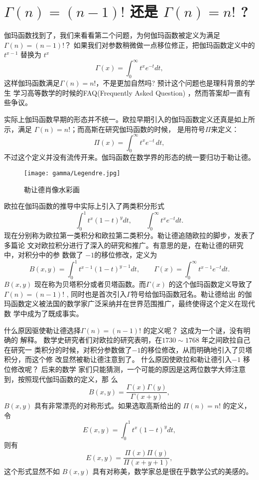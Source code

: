 {\section{$ \Gamma(n) = (n-1)!$ 还是  $ \Gamma(n) = n! $ ? }

伽玛函数找到了，我们来看看第二个问题，为何伽玛函数被定义为满足
$\Gamma(n)=(n-1)!$？ 如果我们对参数稍微做一点移位修正，把伽玛函数定义中的 $t^{x-1}$
替换为 $t^x$ 
$$ \Gamma(x) = \int_0^{\infty} t^{x}e^{-t}dt , $$
这样伽玛函数满足$\Gamma(n)=n!$，不是更加自然吗? 预计这个问题也是理科背景的学生
学习高等数学的时候的FAQ(Frequently Asked Question) ，然而答案却一直有些争议。  

实际上伽玛函数早期的形态并不统一。欧拉早期引入的伽玛函数定义还真是如上所示，满足
$\Gamma(n)=n!$；而高斯在研究伽玛函数的时候， 是用符号$\Pi$来定义： 
$$ \Pi(x)=\int_{0}^\infty t^x e^{-t}\,dt ,$$ 
不过这个定义并没有流传开来。伽玛函数在数学界的形态的统一要归功于勒让德。

\begin{figure}[htbp]
\centering
\texttt{[image: gamma/Legendre.jpg]}
\caption{勒让德肖像水彩画}
\end{figure}

欧拉在伽玛函数的推导中实际上引入了两类积分形式
$$ \int_0^1 t^{x}(1-t)^{y}dt, \quad  \quad \int_0^{\infty} t^{x}e^{-t}dt .$$
现在分别称为欧拉第一类积分和欧拉第二类积分。勒让德追随欧拉的脚步，发表了多篇论
文对欧拉积分进行了深入的研究和推广。有意思的是，在勒让德的研究中，对积分中的参
数做了 $-1$的移位修改，定义为
$$ B(x, y) = \int_0^1 t^{x-1}(1-t)^{y-1}dt, \quad \quad  \Gamma(x) = \int_0^{\infty} t^{x-1}e^{-t}dt .$$
$B(x,y)$ 现在称为贝塔积分或者贝塔函数。而$\Gamma(x)$ 的这个伽玛函数定义导致了 $
\Gamma(n) = (n-1)!$ , 同时也是首次引入$\Gamma$符号给伽玛函数冠名。勒让德给出
的伽玛函数定义被法国的数学家广泛采纳并在世界范围推广，最终使得这个定义在现代数
学中成为了既成事实。

什么原因驱使勒让德选择$\Gamma(n) = (n-1)!$ 的定义呢？ 这成为一个谜，没有明确的
解释。 数学史研究者们对欧拉的研究表明，在$1730\sim1768$ 年之间欧拉自己在研究一
类积分的时候，对积分参数做了$-1$的移位修改，从而明确地引入了贝塔积分，而这个修
改显然被勒让德注意到了。 什么原因使欧拉和勒让德引入$-1$ 移位修改呢？ 后来的数学
家们只能猜测，一个可能的原因是这两位数学大师注意到，按照现代伽玛函数的定义，那
么
\begin{equation}
\label{beta-gamma-decompose}
 B(x,y) = \frac{\Gamma(x)\Gamma(y)}{\Gamma(x+y)} ,
\end{equation}
$B(x,y)$ 具有非常漂亮的对称形式。如果选取高斯给出的 $\Pi(n)=n!$ 的定义，令
$$ E(x, y) = \int_0^1 t^{x}(1-t)^{y}dt , $$
则有
$$ E(x,y) = \frac{\Pi(x)\Pi(y)}{\Pi(x+y+1)} ,$$
这个形式显然不如 $B(x,y)$ 具有对称美，数学家总是很在乎数学公式的美感的。

}
